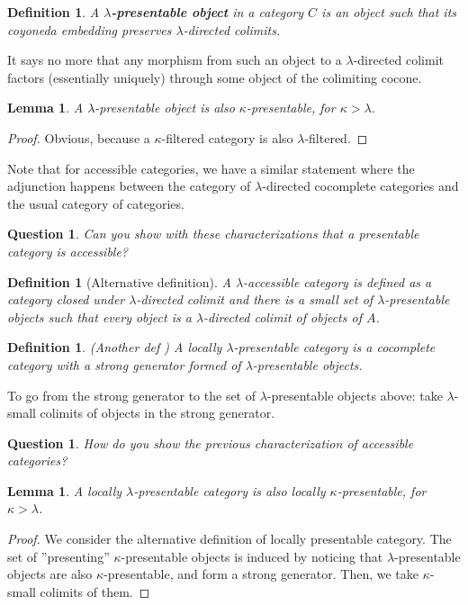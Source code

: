 \documentclass{article}
\newtheorem{definition}[theorem]{Definition}
\newtheorem{question}[theorem]{Question}
\newtheorem{lemma}[theorem]{Lemma}
\begin{document}
  \begin{definition}
    A \textbf{$\lambda$-presentable object} in a category $C$ is an object such
    that its coyoneda embedding preserves $\lambda$-directed colimits.
  \end{definition}
  It says no more that any morphism from such an object to a $\lambda$-directed
  colimit factors (essentially uniquely) through some object of the colimiting cocone.
  \begin{lemma}
   A $\lambda$-presentable object is also $\kappa$-presentable, for $\kappa > \lambda$.
  \end{lemma}
  \begin{proof}
	  Obvious, because a $\kappa$-filtered category is also $\lambda$-filtered.
  \end{proof}
  Note that for accessible categories, we have a similar statement
  \cite[2.26]{adamek_rosicky} where the adjunction happens between the category
  of $\lambda$-directed cocomplete categories and the usual category of categories.
  \begin{question}
   Can you show with these characterizations that a presentable category is
   accessible? 
  \end{question}
  \begin{definition}[Alternative definition]
  A $\lambda$-accessible category is defined as a category closed
  under $\lambda$-directed colimit and there is a small set of
  $\lambda$-presentable objects such that every object is a $\lambda$-directed
  colimit of objects of $A$.
  \end{definition}
  \begin{definition}
	  (Another def \cite[1.20]{adamek_rosicky})
    A locally $\lambda$-presentable category is a cocomplete category
    with a strong generator formed of $\lambda$-presentable objects.
  \end{definition}
  To go from the strong generator to the set of $\lambda$-presentable objects
  above: take $\lambda$-small colimits of objects in the strong generator.
  \begin{question}
    How do you show the previous characterization of accessible categories?
\end{question}
\begin{lemma}
   A locally $\lambda$-presentable category is also locally $\kappa$-presentable, for $\kappa > \lambda$.
\end{lemma}
\begin{proof}
  We consider the alternative definition of locally presentable category.
  The set of ''presenting'' $\kappa$-presentable objects is induced by noticing that
  $\lambda$-presentable objects are also $\kappa$-presentable, and form a strong
  generator. Then, we take $\kappa$-small colimits of them.
\end{proof}
\end{document}
